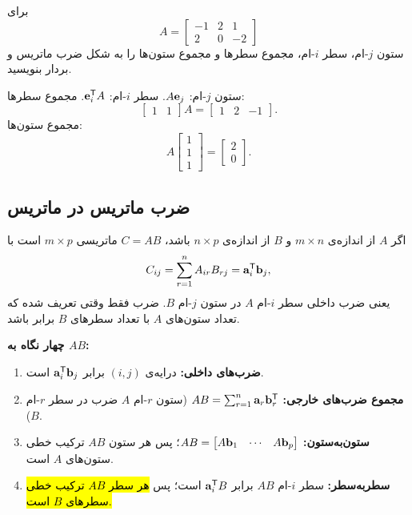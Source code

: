 \begin{example}
برای 
\[
A=\begin{bmatrix}-1&2&1\\2&0&-2\end{bmatrix}
\]
 ستون $j$-ام، سطر $i$-ام، مجموع سطرها و مجموع ستون‌ها را به شکل ضرب ماتریس و بردار بنویسید.
\end{example}
\begin{solution}
ستون $j$-ام: $A\mathbf{e}_j$. سطر $i$-ام: $\mathbf{e}_i^{\mathsf{T}} A$. مجموع سطرها: 
\[
\begin{bmatrix}1&1\end{bmatrix}A=\begin{bmatrix}1&2&-1\end{bmatrix}.
\]
 مجموع ستون‌ها: 
\[
A\begin{bmatrix}1\\1\\1\end{bmatrix}=\begin{bmatrix}2\\0\end{bmatrix}.
\]

\end{solution}

\subsection{ضرب ماتریس در ماتریس}
\begin{definition}
اگر $A$ از اندازه‌ی $m\times n$ و $B$ از اندازه‌ی $n\times p$ باشد، $C=AB$ ماتریسی $m\times p$ است با
\[
C_{ij}=\sum_{r=1}^{n}A_{ir}B_{rj}=\mathbf{a}_i^{\mathsf{T}}\mathbf{b}_j ,
\]
یعنی ضرب داخلی سطر $i$-ام $A$ در ستون $j$-ام $B$. ضرب فقط وقتی تعریف شده که تعداد ستون‌های $A$ با تعداد سطرهای $B$ برابر باشد.
\end{definition}

\textbf{چهار نگاه به $AB$:}
\begin{enumerate}
  \item \textbf{ضرب‌های داخلی:} درایه‌ی $(i,j)$ برابر $\mathbf{a}_i^{\mathsf{T}}\mathbf{b}_j$ است.
  \item \textbf{مجموع ضرب‌های خارجی:} $AB=\sum_{r=1}^{n}\mathbf{a}_r\mathbf{b}_r^{\mathsf{T}}$ (ستون $r$-ام $A$ ضرب در سطر $r$-ام $B$).
  \item \textbf{ستون‌به‌ستون:} $AB=\begin{bmatrix}A\mathbf{b}_1&\cdots&A\mathbf{b}_p\end{bmatrix}$؛ پس هر ستون $AB$ ترکیب خطی ستون‌های $A$ است.
  \item \textbf{سطربه‌سطر:} سطر $i$-ام $AB$ برابر $\mathbf{a}_i^{\mathsf{T}} B$ است؛ پس \hl{هر سطر $AB$ ترکیب خطی سطرهای $B$ است.}
\end{enumerate}

